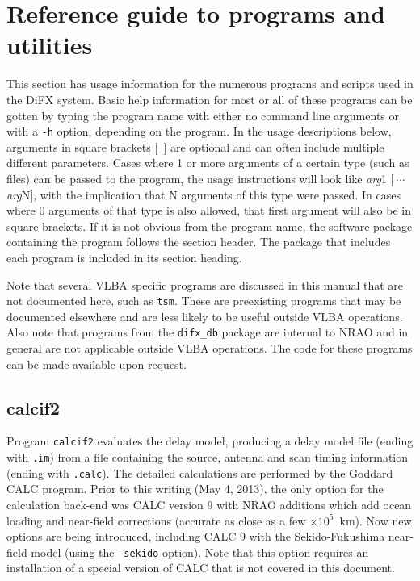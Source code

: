 \section{Reference guide to programs and utilities} \label{sec:programs}

This section has usage information for the numerous programs and scripts used in the DiFX system.
Basic help information for most or all of these programs can be gotten by typing the program name with either no command line arguments or with a {\tt -h} option, depending on the program.
In the usage descriptions below, arguments in square brackets $[$\ $]$ are optional and can often include multiple different parameters.
Cases where 1 or more arguments of a certain type (such as files) can be passed to the program, the usage instructions will look like {\em arg}1 $[\ \cdots$ {\em arg}N$]$, with the implication that N arguments of this type were passed.
In cases where 0 arguments of that type is also allowed, that first argument will also be in square brackets.
If it is not obvious from the program name, the software package containing the program follows the section header.
The package that includes each program is included in its section heading.

Note that several VLBA specific programs are discussed in this manual that are not documented here, such as {\tt tsm}.
These are preexisting programs that may be documented elsewhere and are less likely to be useful outside VLBA operations.
Also note that programs from the {\tt difx\_db} package are internal to NRAO and in general are not applicable outside VLBA operations.
The code for these programs can be made available upon request.








\subsection{calcif2} \label{sec:calcif2}

Program {\tt calcif2} evaluates the delay model, producing a delay model file (ending with {\tt .im}) from a file containing the source, antenna and scan timing information (ending with {\tt .calc}).
The detailed calculations are performed by the Goddard CALC program.
Prior to this writing (May 4, 2013), the only option for the calculation back-end was CALC version 9 with NRAO additions which add ocean loading and near-field corrections (accurate as close as a few $\times 10^5$~km). 
Now new options are being introduced, including CALC 9 with the Sekido-Fukushima near-field model (using the {\tt --sekido} option).
Note that this option requires an installation of a special version of CALC that is not covered in this document.

